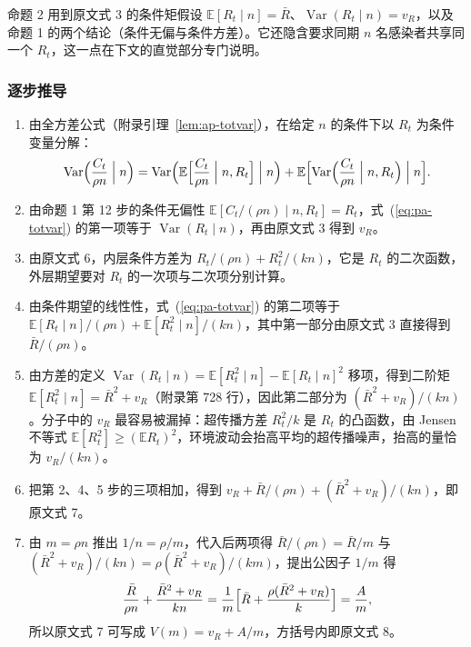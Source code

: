 命题 2 用到原文式 3 的条件矩假设 $\mathbb{E}[R_t\mid n]=\bar R$、$\operatorname{Var}(R_t\mid n)=v_R$，以及命题 1 的两个结论（条件无偏与条件方差）。它还隐含要求同期 $n$ 名感染者共享同一个 $R_t$，这一点在下文的直觉部分专门说明。

\subsubsection{逐步推导}

\begin{enumerate}
\item 由全方差公式（附录引理~\ref{lem:ap-totvar}），在给定 $n$ 的条件下以 $R_t$ 为条件变量分解：
\begin{equation}
\operatorname{Var}\Bigl(\frac{C_t}{\rho n}\Bigm| n\Bigr)=\operatorname{Var}\Bigl(\mathbb{E}\Bigl[\frac{C_t}{\rho n}\Bigm| n,R_t\Bigr]\Bigm| n\Bigr)+\mathbb{E}\Bigl[\operatorname{Var}\Bigl(\frac{C_t}{\rho n}\Bigm| n,R_t\Bigr)\Bigm| n\Bigr].
\label{eq:pa-totvar}
\end{equation}
\item 由命题 1 第 12 步的条件无偏性 $\mathbb{E}[C_t/(\rho n)\mid n,R_t]=R_t$，式~(\ref{eq:pa-totvar}) 的第一项等于 $\operatorname{Var}(R_t\mid n)$，再由原文式 3 得到 $v_R$。
\item 由原文式 6，内层条件方差为 $R_t/(\rho n)+R_t^2/(kn)$，它是 $R_t$ 的二次函数，外层期望要对 $R_t$ 的一次项与二次项分别计算。
\item 由条件期望的线性性，式~(\ref{eq:pa-totvar}) 的第二项等于 $\mathbb{E}[R_t\mid n]/(\rho n)+\mathbb{E}[R_t^2\mid n]/(kn)$，其中第一部分由原文式 3 直接得到 $\bar R/(\rho n)$。
\item 由方差的定义 $\operatorname{Var}(R_t\mid n)=\mathbb{E}[R_t^2\mid n]-\mathbb{E}[R_t\mid n]^2$ 移项，得到二阶矩 $\mathbb{E}[R_t^2\mid n]=\bar R^2+v_R$（附录第 728 行），因此第二部分为 $(\bar R^2+v_R)/(kn)$。分子中的 $v_R$ 最容易被漏掉：超传播方差 $R_t^2/k$ 是 $R_t$ 的凸函数，由 Jensen 不等式 $\mathbb{E}[R_t^2]\ge(\mathbb{E}R_t)^2$，环境波动会抬高平均的超传播噪声，抬高的量恰为 $v_R/(kn)$。
\item 把第 2、4、5 步的三项相加，得到 $v_R+\bar R/(\rho n)+(\bar R^2+v_R)/(kn)$，即原文式 7。
\item 由 $m=\rho n$ 推出 $1/n=\rho/m$，代入后两项得 $\bar R/(\rho n)=\bar R/m$ 与 $(\bar R^2+v_R)/(kn)=\rho(\bar R^2+v_R)/(km)$，提出公因子 $1/m$ 得
\begin{equation*}
\frac{\bar R}{\rho n}+\frac{\bar R^2+v_R}{kn}=\frac{1}{m}\Bigl[\bar R+\frac{\rho(\bar R^2+v_R)}{k}\Bigr]=\frac{A}{m},
\end{equation*}
所以原文式 7 可写成 $V(m)=v_R+A/m$，方括号内即原文式 8。
\end{enumerate}

